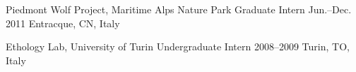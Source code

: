 \begin{cventries}
    
  \cventry
    {Piedmont Wolf Project, Maritime Alps Nature Park} %
    {Graduate Intern} %
    {Jun.--Dec. 2011} %
    {Entracque, CN, Italy} %
    {}

    
  \cventry
    {Ethology Lab, University of Turin} %
    {Undergraduate Intern} %
    {2008--2009} %
    {Turin, TO, Italy} %
    {}

    
\end{cventries}
